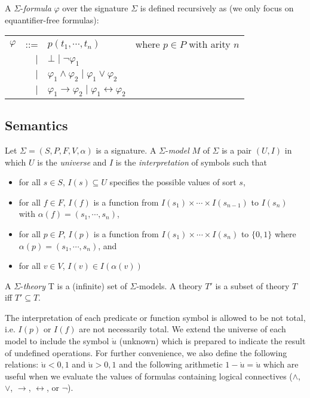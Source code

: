 A $\Sigma$-\emph{formula} $\varphi$ over the signature $\Sigma$ is defined recursively as (we only focus on equantifier-free formulas):

\begin{center}
\begin{tabular}{l r l l}
$\varphi$ &::=& $p(t_1, \cdots, t_n)$ &where $p \in P$ with arity $n$ \\ 
&$\mid$ & $\bot \mid \neg \varphi_1$ &\\
&$\mid$ & $\varphi_1 \wedge \varphi_2 \mid \varphi_1 \vee \varphi_2$ & \\
&$\mid$ & $\varphi_1 \rightarrow \varphi_2 \mid \varphi_1 \leftrightarrow \varphi_2$ & \\
\end{tabular}
\end{center}

\subsection{Semantics}

\begin{definition}
Let $\Sigma = (S, P, F, V, \alpha)$ is a signature. A $\Sigma$-\emph{model} $M$ of $\Sigma$ is a pair $(U, I)$ in which $U$ is the \emph{universe} and $I$ is the \emph{interpretation} of symbols such that
\begin{itemize}
\sloppy
\item for all $s \in S$, $I(s) \subseteq U$ specifies the possible values of sort $s$,
\item for all $f \in F$, $I(f)$ is a function from $I(s_1) \times \cdots \times I(s_{n-1})$ to $I(s_n)$ with ${\alpha(f) = (s_1,\cdots, s_n)}$,
\item for all $p \in P$, $I(p)$ is a function from $I(s_1) \times \cdots \times I(s_n)$ to $\{0, 1\}$ where ${\alpha(p) = (s_1,\cdots, s_n)}$, and
\item for all $v \in V$, $I(v) \in I(\alpha(v))$
\end{itemize}
A $\Sigma$-\emph{theory} T is a (infinite) set of $\Sigma$-models. A theory $T'$ is a subset of theory $T$ iff $T' \subseteq T$.
\end{definition}

The interpretation of each predicate or function symbol is allowed to be not total, i.e. $I(p)$ or $I(f)$ are not necessarily total. We extend the universe of each model to include the symbol $\mathring{u}$ (unknown) which is prepared to indicate the result of undefined operations. For further convenience, we also define the following relations: $\mathring{u} < 0, 1$ and $\mathring{u} > 0, 1$ and the following arithmetic $1 - \mathring{u} = \mathring{u}$ which are useful when we evaluate the values of formulas containing logical connectives ($\wedge$, $\vee$, $\rightarrow$, $\leftrightarrow$, or $\neg$). 

